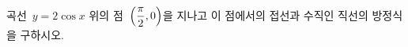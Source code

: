 곡선~$y=2\cos x$ 위의 점~$\left(\dfrac{\pi}{2}{,}\mkern3mu\mathopen{}0\right)$을 지나고 이 점에서의 접선과 수직인 직선의 방정식을 구하시오.
